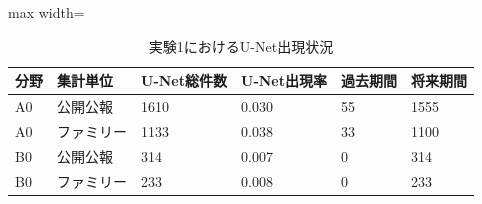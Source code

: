 \begin{table}[tbp]
\centering
\small
\caption{実験1におけるU-Net出現状況}
\label{tab:experiment1_unet_occurrence_table}
\begin{adjustbox}{max width=\textwidth}
\begin{tabular}{llllll}
\toprule
分野 & 集計単位 & U-Net総件数 & U-Net出現率 & 過去期間 & 将来期間 \\
\midrule
A0 & 公開公報 & 1610 & 0.030 & 55 & 1555 \\
A0 & ファミリー & 1133 & 0.038 & 33 & 1100 \\
B0 & 公開公報 & 314 & 0.007 & 0 & 314 \\
B0 & ファミリー & 233 & 0.008 & 0 & 233 \\
\bottomrule
\end{tabular}
\end{adjustbox}
\end{table}
